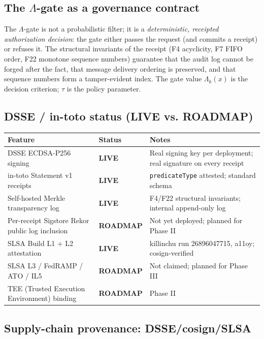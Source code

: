 \documentclass[11pt,letterpaper]{article}
\theoremstyle{definition}
\newcommand{\Lam}{\Lambda}
\begin{document}
\subsection{The $\Lam$-gate as a governance contract}

The $\Lam$-gate is not a probabilistic filter; it is a \emph{deterministic,
receipted authorization decision}: the gate either passes the request (and
commits a receipt) or refuses it.  The structural invariants of the receipt
(F4 acyclicity, F7 FIFO order, F22 monotone sequence numbers) guarantee that the
audit log cannot be forged after the fact, that message delivery ordering
is preserved, and that sequence numbers form a tamper-evident index.  The gate
value $\Lam_k(x)$ is the decision criterion; $\tau$ is the policy parameter.

\subsection{DSSE / in-toto status (LIVE vs. ROADMAP)}

\begin{center}\small
\begin{tabular}{@{}p{5.5cm}p{2.0cm}p{5.5cm}@{}}
\toprule
\textbf{Feature} & \textbf{Status} & \textbf{Notes} \\
\midrule
DSSE ECDSA-P256 signing & \textbf{LIVE} &
  Real signing key per deployment; real signature on every receipt \\
in-toto Statement v1 receipts & \textbf{LIVE} &
  \texttt{predicateType} attested; standard schema \\
Self-hosted Merkle transparency log & \textbf{LIVE} &
  F4/F22 structural invariants; internal append-only log \\
Per-receipt Sigstore Rekor public log inclusion & \textbf{ROADMAP} &
  Not yet deployed; planned for Phase II \\
SLSA Build L1 + L2 attestation & \textbf{LIVE} &
  killinchu run 26896047715, a11oy; cosign-verified \\
SLSA L3 / FedRAMP / ATO / IL5 & \textbf{ROADMAP} &
  Not claimed; planned for Phase III \\
TEE (Trusted Execution Environment) binding & \textbf{ROADMAP} &
  Phase II \\
\bottomrule
\end{tabular}
\end{center}

\subsection{Supply-chain provenance: DSSE/cosign/SLSA}
\end{document}
